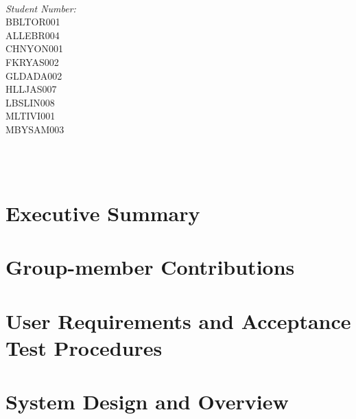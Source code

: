 \documentclass[12pt]{article}
\makeatletter
\let\thedate\@date
\makeatother
\begin{document}
\begin{titlepage}
\begin{minipage}{0.4\textwidth}
\begin{flushleft}
			\end{flushleft}
			\end{minipage}~
			\begin{minipage}{0.4\textwidth}
			\begin{flushright} \large
			\emph{Student Number:} \\
      BBLTOR001\\
      ALLEBR004\\
      CHNYON001\\
      FKRYAS002\\
      GLDADA002\\
      HLLJAS007\\
      LBSLIN008\\
      MLTIVI001\\
      MBYSAM003\\									%
		\end{flushright}
	\end{minipage}\\[0.5 cm]
	
	{\large \thedate}\\[0.5 cm]
 
	\vfill
	
\end{titlepage}


\tableofcontents
\pagebreak


\section{Executive Summary}

\section{Group-member Contributions}

\section{User Requirements and Acceptance Test Procedures}

\section{System Design and Overview}
\end{document}
